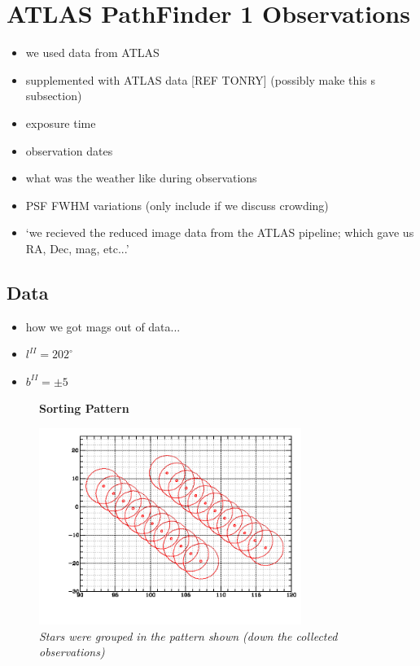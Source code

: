 \documentclass[aps,prl,twocolumn,superscriptaddress]{revtex4-1}
\begin{document}
\section{ATLAS PathFinder 1 Observations}
\begin{itemize}
	\item{} we used data from ATLAS
	\item{} supplemented with ATLAS data [REF TONRY] (possibly make this s subsection)
	\item{} exposure time
	\item{} observation dates
	\item{} what was the weather like during observations
	\item{} PSF FWHM variations (only include if we discuss crowding)
	\item{} `we recieved the reduced image data from the ATLAS pipeline; which gave us RA, Dec, mag, etc...'
\end{itemize}

\subsection{Data}

\begin{itemize}
	\item{} how we got mags out of data...
	\item{} $l^{II}=202^{\circ}$
	\item{} $b^{II}=\pm5$
\end{itemize}

\begin{figure}[H]
	\centering
	\textbf{Sorting Pattern}\par\medskip
		\includegraphics[width=3.35in]{figures/fromJT/sortedFOV.png}
	\caption{\it \small{Stars were grouped in the pattern shown (down the collected observations)}}
	\label{fig:sortpat}
\end{figure}
\end{document}

